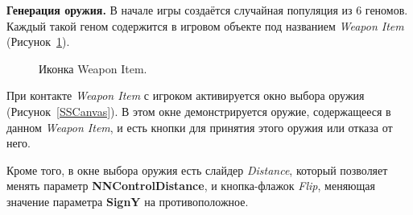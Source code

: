 \textbf{Генерация оружия.} В начале игры создаётся случайная популяция из 6 геномов. Каждый такой геном содержится в игровом объекте под названием \textit{Weapon Item} (Рисунок~\ref{WeaponItemIcon}). 

\begin{figure}[ht]
    \begin{center}

        \caption{
            \label{WeaponItemIcon}
            Иконка Weapon Item.
        }
    \end {center}
\end {figure}

При контакте \textit{Weapon Item} с игроком активируется окно выбора оружия (Рисунок~\ref{SSCanvas}). В этом окне демонстрируется оружие, содержащееся в данном \textit{Weapon Item}, и есть кнопки для принятия этого оружия или отказа от него.

Кроме того, в окне выбора оружия есть слайдер \textit{Distance}, который позволяет менять параметр {\small \textbf{NNControlDistance}}, и кнопка-флажок \textit{Flip}, меняющая значение параметра {\small \textbf{SignY}} на противоположное.

